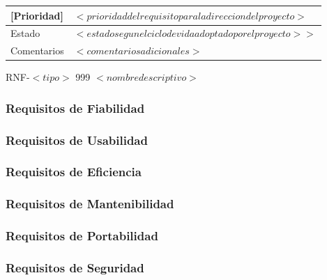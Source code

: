 \begin{Artefacto}[H]
\begin{tabular}{|p{3cm}|p{10cm}|}
         \hline
         \cellcolor{gray30}  [Prioridad] &  	$<prioridad del requisito para la direccion del proyecto>$\\
         \hline
         \cellcolor{gray30}  Estado	&$<estado  segun el ciclo de vida adoptado por el proyecto>>$\\   
        \hline       
         \cellcolor{gray30}  Comentarios	& $<comentarios adicionales>$ \\   
        \hline
  
    \end{tabular}
\caption{RNF-$<tipo>$ 999	$<nombre descriptivo>$ }
  \end{Artefacto}




\subsubsection{Requisitos de Fiabilidad}

 
\subsubsection{Requisitos de Usabilidad}

 
\subsubsection{Requisitos de Eficiencia}

 
\subsubsection{Requisitos de Mantenibilidad}

 
\subsubsection{Requisitos de Portabilidad}

 
\subsubsection{Requisitos de Seguridad}

